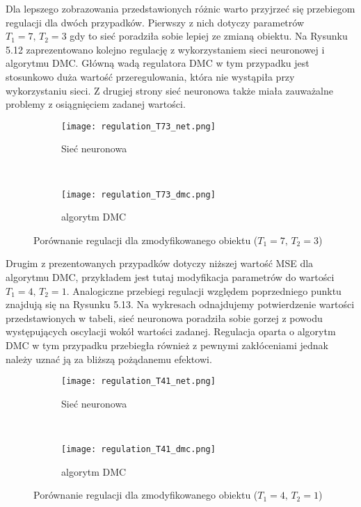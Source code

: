 \par Dla lepszego zobrazowania przedstawionych różnic warto przyjrzeć się przebiegom regulacji dla dwóch przypadków. Pierwszy z nich dotyczy parametrów \( T_1=7, \, T_2=3 \) gdy to sieć poradziła sobie lepiej ze zmianą obiektu. Na Rysunku 5.12 zaprezentowano kolejno regulację z wykorzystaniem sieci neuronowej i algorytmu DMC. Główną wadą regulatora DMC w tym przypadku jest stosunkowo duża wartość przeregulowania, która nie wystąpiła przy wykorzystaniu sieci. Z drugiej strony sieć neuronowa także miała zauważalne problemy z osiągnięciem zadanej wartości.

\begin{figure}[!htb]
    \centering
    \begin{subfigure}[t]{0.5\textwidth}
        \centering
        \texttt{[image: regulation\_T73\_net.png]}
        \caption{Sieć neuronowa}
    \end{subfigure}%
    ~ 
    \begin{subfigure}[t]{0.5\textwidth}
        \centering
        \texttt{[image: regulation\_T73\_dmc.png]}
        \caption{algorytm DMC}
    \end{subfigure}
    \caption{Porównanie regulacji dla zmodyfikowanego obiektu (\( T_1=7, \, T_2=3 \))}
\end{figure}

\par Drugim z prezentowanych przypadków dotyczy niższej wartość MSE dla algorytmu DMC, przykładem jest tutaj modyfikacja parametrów do wartości \( T_1=4, \, T_2=1 \). Analogiczne przebiegi regulacji względem poprzedniego punktu znajdują się na Rysunku 5.13. Na wykresach odnajdujemy potwierdzenie wartości przedstawionych w tabeli, sieć neuronowa poradziła sobie gorzej z powodu występujących oscylacji wokół wartości zadanej. Regulacja oparta o algorytm DMC w tym przypadku przebiegła również z pewnymi zakłóceniami jednak należy uznać ją za bliższą pożądanemu efektowi.

\begin{figure}[!htb]
    \centering
    \begin{subfigure}[t]{0.5\textwidth}
        \centering
        \texttt{[image: regulation\_T41\_net.png]}
        \caption{Sieć neuronowa}
    \end{subfigure}%
    ~ 
    \begin{subfigure}[t]{0.5\textwidth}
        \centering
        \texttt{[image: regulation\_T41\_dmc.png]}
        \caption{algorytm DMC}
    \end{subfigure}
    \caption{Porównanie regulacji dla zmodyfikowanego obiektu (\( T_1=4, \, T_2=1 \))}
\end{figure}

